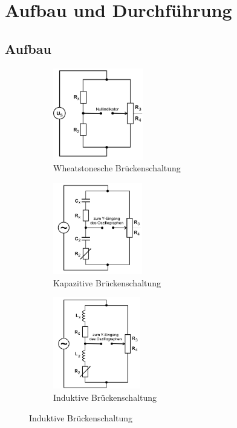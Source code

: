 \newpage
\section{Aufbau und Durchführung}

\subsection{Aufbau}

\begin{figure}
    \begin{subfigure}{0.5\textwidth}
        \centering
        \includegraphics[height=4cm]{Bilder/Wheatstone.png}
        \caption{Wheatstonesche Brückenschaltung}
        \label{fig:Wheatstone}
    \end{subfigure}
    \begin{subfigure}{0.5\textwidth}
        \centering
        \includegraphics[height=4cm]{Bilder/Kapazitiv.png}
        \caption{Kapazitive Brückenschaltung}
        \label{fig:Kapazitiv}
    \end{subfigure}
    \begin{subfigure}{0.5\textwidth}
        \centering
        \includegraphics[height=4cm]{Bilder/Induktiv}
        \caption{Induktive Brückenschaltung}
        \label{fig:Induktiv}
    \end{subfigure}

\end{figure}
